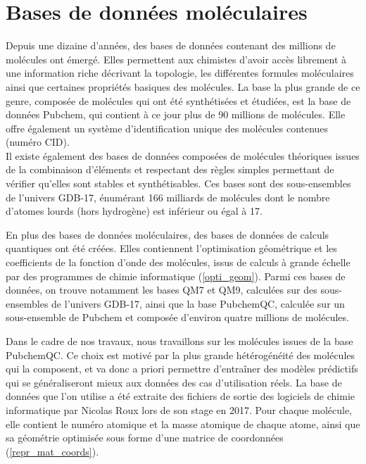 \section{Bases de données moléculaires}
\label{donnees_bases}

\par Depuis une dizaine d'années, des bases de données contenant des millions de molécules ont émergé. Elles permettent aux chimistes d'avoir accès librement à une information riche décrivant la topologie, les différentes formules moléculaires ainsi que certaines propriétés basiques des molécules. La base la plus grande de ce genre, composée de molécules qui ont été synthétisées et étudiées, est la base de données Pubchem\cite{pubchem}, qui contient à ce jour plus de 90 millions de molécules. Elle offre également un système d'identification unique des molécules contenues (numéro CID). \\
Il existe également des bases de données composées de molécules théoriques issues de la combinaison d'éléments et respectant des règles simples permettant de vérifier qu'elles sont stables et synthétisables. Ces bases sont des sous-ensembles de l'univers GDB-17\cite{gdb}, énumérant 166 milliards de molécules dont le nombre d'atomes lourds (hors hydrogène) est inférieur ou égal à 17.\\

\par En plus des bases de données moléculaires, des bases de données de calculs quantiques ont été créées. Elles contiennent l'optimisation géométrique et les coefficients de la fonction d'onde des molécules, issus de calculs à grande échelle par des programmes de chimie informatique (\ref{opti_geom}). Parmi ces bases de données, on trouve notamment les bases QM7 et QM9, calculées sur des sous-ensembles de l'univers GDB-17, ainsi que la base PubchemQC\cite{pubchemqc}, calculée sur un sous-ensemble de Pubchem et composée d'environ quatre millions de molécules.\\

\par Dans le cadre de nos travaux, nous travaillons sur les molécules issues de la base PubchemQC. Ce choix est motivé par la plus grande hétérogénéité des molécules qui la composent, et va donc a priori permettre d'entraîner des modèles prédictifs qui se généraliseront mieux aux données des cas d'utilisation réels. La base de données que l'on utilise a été extraite des fichiers de sortie des logiciels de chimie informatique par Nicolas Roux lors de son stage en 2017. Pour chaque molécule, elle contient le numéro atomique et la masse atomique de chaque atome, ainsi que sa géométrie optimisée sous forme d'une matrice de coordonnées (\ref{repr_mat_coords}).


